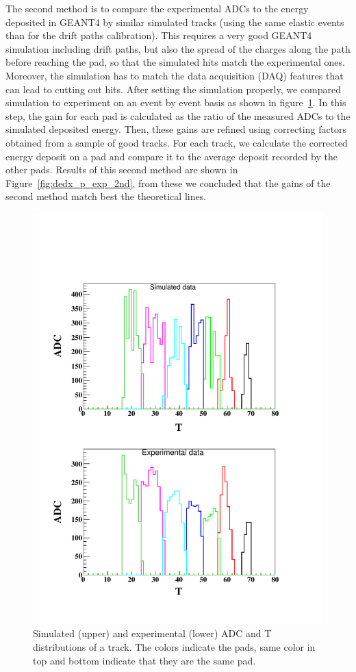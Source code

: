 \documentclass[twocolumn,showpacs,superscriptaddress,groupedaddress]{revtex4}
\begin{document}
The second method is to compare the experimental ADCs to the energy deposited in 
GEANT4 by similar simulated tracks (using the same elastic events than for the drift 
paths calibration). This requires a very good GEANT4 simulation 
including drift paths, but also the spread of the charges along the path
before reaching the pad, so that the simulated hits match the experimental 
ones. Moreover, the simulation has to match the data acquisition (DAQ) features 
that can lead to cutting out hits. After setting the simulation properly, we 
compared simulation to experiment on an event by event basis as shown in 
figure~\ref{fig:EVENT_adc_tdc}. In this step, the gain for each pad is calculated 
as the ratio of the measured ADCs to the simulated deposited energy.  
Then, these gains are refined using correcting factors obtained from a 
sample of good tracks. For each track, we calculate the corrected 
energy deposit on a pad and compare it to the average
deposit recorded by the other pads. 
Results of this second method are shown in Figure~\ref{fig:dedx_p_exp_2nd},
from these we concluded that the gains of the 
second method match best the theoretical lines.

\begin{figure}[tb]
   \centering
\includegraphics[scale=0.42]{fig_2017/Event_ADC_Graph_8799283.pdf}
\caption{Simulated (upper) and experimental (lower) ADC and T distributions 
of a track. The colors indicate the pads, same color in top and bottom indicate 
that they are the same pad.}
\label{fig:EVENT_adc_tdc}
\end{figure}
\end{document}
